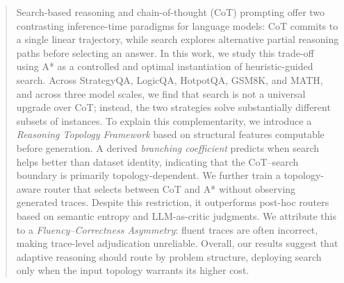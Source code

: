 \documentclass[11pt]{article}
\begin{document}



\begin{abstract}
Search-based reasoning and chain-of-thought (CoT) prompting offer two contrasting inference-time paradigms for language models: CoT commits to a single linear trajectory, while search explores alternative partial reasoning paths before selecting an answer. In this work, we study this trade-off using A* as a controlled and optimal instantiation of heuristic-guided search. Across StrategyQA, LogicQA, HotpotQA, GSM8K, and MATH, and across three model scales, we find that search is not a universal upgrade over CoT; instead, the two strategies solve substantially different subsets of instances. To explain this complementarity, we introduce a \emph{Reasoning Topology Framework} based on structural features computable before generation. A derived \emph{branching coefficient} predicts when search helps better than dataset identity, indicating that the CoT--search boundary is primarily topology-dependent. We further train a topology-aware router that selects between CoT and A* without observing generated traces. Despite this restriction, it outperforms post-hoc routers based on semantic entropy and LLM-as-critic judgments. We attribute this to a \emph{Fluency--Correctness Asymmetry}: fluent traces are often incorrect, making trace-level adjudication unreliable. Overall, our results suggest that adaptive reasoning should route by problem structure, deploying search only when the input topology warrants its higher cost.
\end{abstract}
\end{document}
